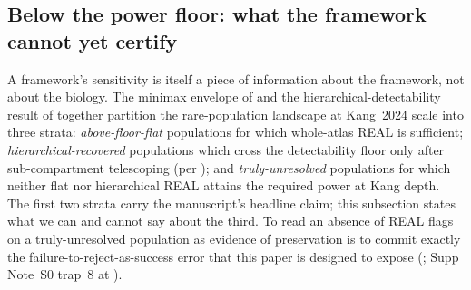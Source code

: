 %
%
%

\subsection{Below the power floor: what the framework cannot yet certify}
\label{sec:below-floor-epistemic}

A framework's sensitivity is itself a piece of information about the framework, not about the biology. The minimax envelope of  and the hierarchical-detectability result of  together partition the rare-population landscape at Kang~2024 scale into three strata: \emph{above-floor-flat} populations for which whole-atlas REAL is sufficient; \emph{hierarchical-recovered} populations which cross the detectability floor only after sub-compartment telescoping (per ); and \emph{truly-unresolved} populations for which neither flat nor hierarchical REAL attains the required power at Kang depth. The first two strata carry the manuscript's headline claim; this subsection states what we can and cannot say about the third. To read an absence of \textsc{REAL} flags on a truly-unresolved population as evidence of preservation is to commit exactly the failure-to-reject-as-success error that this paper is designed to expose (; Supp Note~S0 trap~8 at ).

